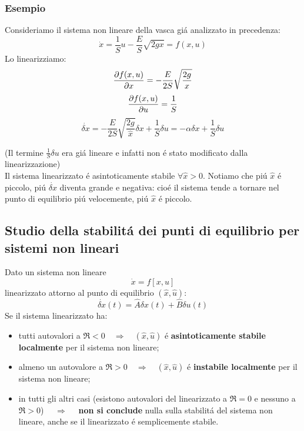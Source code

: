 \documentclass[../main.tex]{subfiles}
\begin{document}
	\subsubsection*{Esempio}
		Consideriamo il sistema non lineare della vasca gi\'a analizzato in precedenza:
		\[ \dot x = \frac{1}{S}u - \frac{E}{S} \sqrt{2gx} = f(x,u) \]
		Lo linearizziamo:
		\[ \frac{\partial f(x,u)}{\partial x} = -\frac{E}{2S} \sqrt{\frac{2g}{x}} \]
		\[ \frac{\partial f(x,u)}{\partial u} = \frac{1}{S} \]
		\[ \dot{\delta x} = -\frac{E}{2S} \sqrt{\frac{2g}{\hat x}} \delta x + \frac{1}{S} \delta u  = - \alpha \delta x + \frac{1}{S} \delta u\]
		
		(Il termine $ \frac{1}{S} \delta u $ era gi\'a lineare e infatti non \'e stato modificato dalla linearizzazione)\\
		Il sistema linearizzato \'e asintoticamente stabile $ \forall \hat x > 0 $. Notiamo che pi\'u $ \hat x $ \'e piccolo, pi\'u $ \dot{\delta x} $ diventa grande e negativa: cio\'e il sistema tende a tornare nel punto di equilibrio pi\'u velocemente, pi\'u $ \hat x $ \'e piccolo.
		
	\subsection{Studio della stabilit\'a dei punti di equilibrio per sistemi non lineari}
		Dato un sistema non lineare
		\[ \dot x = f\left[ x,u \right] \]
		linearizzato attorno al punto di equilibrio $ (\hat x, \hat u) $:
		\[ \dot{\delta x}(t) = \hat A \delta x(t) + \hat B \delta u(t) \]
		Se il sistema linearizzato ha:
		\begin{itemize}
			\item
				tutti autovalori a $ \Re < 0 \quad \Rightarrow \quad (\hat x, \hat u) $ \'e \textbf{asintoticamente stabile localmente} per il sistema non lineare;
			\item
				almeno un autovalore a $ \Re > 0 \quad \Rightarrow \quad (\hat x, \hat u) $ \'e \textbf{instabile localmente} per il sistema non lineare;
			\item
				in tutti gli altri casi (esistono autovalori del linearizzato a $ \Re = 0 $ e nessuno a $ \Re > 0 $) $ \quad \Rightarrow \quad $ \textbf{non si conclude} nulla sulla stabilit\'a del sistema non lineare, anche se il linearizzato \'e semplicemente stabile.
		\end{itemize}
	
\end{document}
